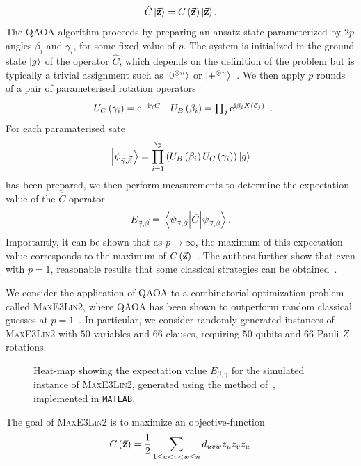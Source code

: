 \[\hat{C}\ket{\va{z}}=C\left(\va{z}\right)\ket{\va{z}}.\]
The QAOA algorithm proceeds by preparing an ansatz state parameterized by $2p$ angles $\beta_{i}$ and $\gamma_{i}$, for some fixed value of $p$. The system is initialized in the ground state $\ket{g}$ of the operator $\hat{C}$, which depends on the definition of the problem but is typically a trivial assignment such as $\ket{0^{\otimes n}}$ or $\ket{+^{\otimes n}}$~\cite{Farhi2014,Farhi2014b}. We then apply $p$ rounds of a pair of parameterised rotation operators
\[\begin{array}{lr}
U_{C}\left(\gamma_{i}\right)=\mathrm{e}^{-\mathrm{i} \gamma \hat{C}} &  U_{B}\left(\beta_{i}\right) = \prod_{j}\mathrm{e}^{\mathrm{i}\beta_{i} X(\va{e}_{j})}
\end{array}.\]
For each paramaterised sate 
\[\ket{\psi_{\va{\gamma},\va{\beta}}}=\prod_{i=1}^{\p}\left(U_{B}\left(\beta_{i}\right)U_{C}\left(\gamma_{i}\right)\right)\ket{g}\]
has been prepared, we then perform measurements to determine the expectation value of the $\hat{C}$ operator 
\[E_{\va{\gamma},\va{\beta}}=\matrixel{\psi_{\va{\gamma},\va{\beta}}}{\hat{C}}{\psi_{\va{\gamma},\va{\beta}}}.\]
Importantly, it can be shown that as $p\rightarrow \infty$, the maximum of this expectation value corresponds to the maximum of $C\left(\va{z}\right)$~\cite{Farhi2014}. The authors further show that even with $p=1$, reasonable results that some classical strategies can be obtained~\cite{Farhi2014,Farhi2014b}.\par
We consider the application of QAOA to a combinatorial optimization problem called \textsc{MaxE3Lin2}, where QAOA has been shown to outperform random classical guesses at $p=1$~\cite{Farhi2014b}. In particular, we consider randomly generated instances of \textsc{MaxE3Lin2} with $50$ variables and $66$ clauses, requiring $50$ qubits and $66$ Pauli $Z$ rotations.\par
\begin{figure}[t]
\centering
\begin{scaletikzpicturetowidth}{0.65\textwidth}

\end{scaletikzpicturetowidth}
\caption{Heat-map showing the expectation value $E_{\beta,\gamma}$ for the simulated instance of \textsc{MaxE3Lin2}, generated using the method of~\cite{VandenNest2009}, implemented in \texttt{MATLAB}.}\label{fig:mc_qaoa}
\end{figure}
The goal of \textsc{MaxE3Lin2} is to maximize an objective-function
\[C\left(\va{z}\right) = \frac{1}{2}\sum_{1\leq u < v < w \leq n} d_{uvw}z_{u}z_{v}z_{w}\]
